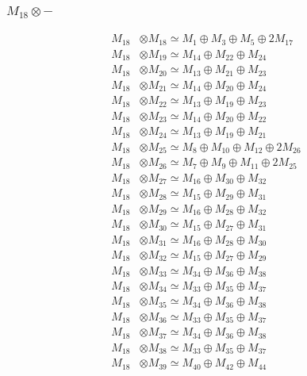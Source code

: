 \subsubsection{$ M_{18}\otimes -$}
\begin{align*}
M_{18} &\otimes M_{18} \simeq M_{1} \oplus M_{3} \oplus M_{5} \oplus 2M_{17} \\
M_{18} &\otimes M_{19} \simeq M_{14} \oplus M_{22} \oplus M_{24} \\
M_{18} &\otimes M_{20} \simeq M_{13} \oplus M_{21} \oplus M_{23} \\
M_{18} &\otimes M_{21} \simeq M_{14} \oplus M_{20} \oplus M_{24} \\
M_{18} &\otimes M_{22} \simeq M_{13} \oplus M_{19} \oplus M_{23} \\
M_{18} &\otimes M_{23} \simeq M_{14} \oplus M_{20} \oplus M_{22} \\
M_{18} &\otimes M_{24} \simeq M_{13} \oplus M_{19} \oplus M_{21} \\
M_{18} &\otimes M_{25} \simeq M_{8} \oplus M_{10} \oplus M_{12} \oplus 2M_{26} \\
M_{18} &\otimes M_{26} \simeq M_{7} \oplus M_{9} \oplus M_{11} \oplus 2M_{25} \\
M_{18} &\otimes M_{27} \simeq M_{16} \oplus M_{30} \oplus M_{32} \\
M_{18} &\otimes M_{28} \simeq M_{15} \oplus M_{29} \oplus M_{31} \\
M_{18} &\otimes M_{29} \simeq M_{16} \oplus M_{28} \oplus M_{32} \\
M_{18} &\otimes M_{30} \simeq M_{15} \oplus M_{27} \oplus M_{31} \\
M_{18} &\otimes M_{31} \simeq M_{16} \oplus M_{28} \oplus M_{30} \\
M_{18} &\otimes M_{32} \simeq M_{15} \oplus M_{27} \oplus M_{29} \\
M_{18} &\otimes M_{33} \simeq M_{34} \oplus M_{36} \oplus M_{38} \\
M_{18} &\otimes M_{34} \simeq M_{33} \oplus M_{35} \oplus M_{37} \\
M_{18} &\otimes M_{35} \simeq M_{34} \oplus M_{36} \oplus M_{38} \\
M_{18} &\otimes M_{36} \simeq M_{33} \oplus M_{35} \oplus M_{37} \\
M_{18} &\otimes M_{37} \simeq M_{34} \oplus M_{36} \oplus M_{38} \\
M_{18} &\otimes M_{38} \simeq M_{33} \oplus M_{35} \oplus M_{37} \\
M_{18} &\otimes M_{39} \simeq M_{40} \oplus M_{42} \oplus M_{44} \\

\end{align*}
